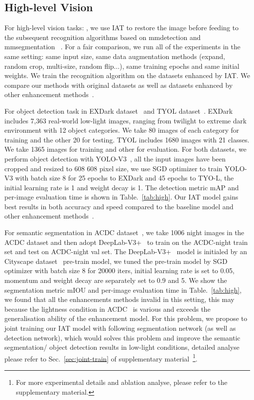 \documentclass{bmvc2k}
\begin{document}
\subsection{High-level Vision}
\label{exp:highlevel}



For high-level vision tasks: , we use IAT to restore the image before feeding to the subsequent recognition algorithms based on mmdetection and mmsegmentation ~\cite{mmdetection,mmseg2020}. For a fair comparison, we run all of the experiments in the same setting: same input size, same data augmentation methods (expand, random crop, multi-size, random flip...), same training epochs and same initial weights. We train the recognition algorithm on the datasets enhanced by IAT. We compare our methods with original datasets as well as datasets enhanced by other enhancement methods~\cite{Lv2018MBLLEN,Deep_LPF,zero_dce}. 

For object detection task in  EXDark dataset~\cite{EXDark} and  TYOL dataset~\cite{Toyota_light}. EXDark includes 7,363 real-world low-light images, ranging from twilight to extreme dark environment with 12 object categories. We take 
80 images of each category for training and the other 20 for testing.  TYOL includes 1680 images with 21 classes. We take 1365 images for training and other for evaluation. For both datasets, we perform object detection with YOLO-V3~\cite{yolov3}, all the input images have been cropped and resized to 608  608 pixel size, we use SGD optimizer to train YOLO-V3 with batch size 8 for 25 epochs to EXDark and 45 epochs to TYO-L, the initial learning rate is 1 and weight decay is 1. The detection metric mAP and per-image evaluation time is shown in Table.~\ref{tab:high}. Our IAT model gains best results in both accuracy and speed compared to the baseline model and other enhancement methods~\cite{Lv2018MBLLEN,Deep_LPF,zero_dce}.  

For semantic segmentation in  ACDC dataset~\cite{ACDC}, we take 1006 night images in the ACDC dataset and then adopt DeepLab-V3+~\cite{Deeplabv3plus} to train on the ACDC-night train set and test on ACDC-night val set. The DeepLab-V3+~\cite{Deeplabv3plus} model is initialed by an Cityscape dataset~\cite{Cordts2016Cityscapes} pre-train model, we tuned the pre-train model by SGD optimizer with batch size 8 for 20000 iters, initial learning rate is set to 0.05, momentum and weight decay are separately set to 0.9 and 5. We show the segmentation metric mIOU and per-image evaluation time in Table.~\ref{tab:high}, we found that all the enhancements methods invalid in this setting, this may because the lightness condition in ACDC~\cite{ACDC} is various and exceeds the generalisation ability of the enhancement model. For this problem, we propose to joint training our IAT model with following segmentation network (as well as detection network), which would solves this problem and improve the semantic segmentation/ object detection results in low-light conditions, detailed analyse please refer to Sec.~\ref{sec:joint-train} of supplementary material~\footnote{For more experimental details and ablation analyse, please refer to the supplementary material.}.    
\vspace{-2mm}
\end{document}
